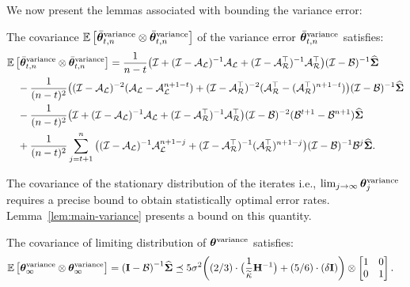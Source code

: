 We now present the lemmas associated with bounding the variance error:
\begin{lemma}\label{lem:average-covar-var}
	The covariance $\E{\thetavb^{\textrm{variance}} \otimes \thetavb^{\text{variance}}}$ of the variance error $\thetavb^{\textrm{variance}}$ satisfies:
	\iffalse
	\begin{align*}
	\lim_{n \to \infty}\E{\thetavb^{\textrm{variance}} \otimes \thetavb^{\text{variance}}} = \frac{1}{n-t}\big(\eyeT + (\eyeT-\AL)^{-1}\AL + (\eyeT-\AR\T)^{-1}\AR\T\big)(\eyeT-\BT)^{-1}\Sigh.
	\end{align*}
	\fi{\small
	\begin{align*}
	&\E{\thetavb^{\textrm{variance}} \otimes \thetavb^{\text{variance}}} = \frac{1}{n-t}\big(\eyeT + (\eyeT-\AL)^{-1}\AL + (\eyeT-\AR\T)^{-1}\AR\T\big)(\eyeT-\BT)^{-1}\Sigh	\nonumber\\
	&\quad -\frac{1}{(n-t)^2}\big((\eyeT-\AL)^{-2}(\AL-\AL^{n+1-t})+(\eyeT-\AR\T)^{-2}(\AR\T-(\AR\T)^{n+1-t})\big)(\eyeT-\BT)^{-1}\Sigh\nonumber\\
	&\quad -\frac{1}{(n-t)^2}\big(\eyeT + (\eyeT-\AL)^{-1}\AL + (\eyeT-\AR\T)^{-1}\AR\T\big)(\eyeT-\BT)^{-2}(\BT^{t+1}-\BT^{n+1})\Sigh\nonumber\\
	&\quad +\frac{1}{(n-t)^2}\sum_{j=t+1}^n\big((\eyeT-\AL)^{-1}\AL^{n+1-j}+(\eyeT-\AR\T)^{-1}(\AR\T)^{n+1-j}\big)(\eyeT-\BT)^{-1}\BT^j\Sigh.
	\end{align*}}
\end{lemma}
The covariance of the stationary distribution of the iterates i.e., $\lim_{j\to\infty}\thetav_j^{\textrm{variance}}$ requires a precise bound to obtain statistically optimal error rates. Lemma~\ref{lem:main-variance} presents a bound on this quantity. 
\begin{lemma}\label{lem:main-variance}
The covariance of limiting distribution of $\thetav^{\textrm{variance}}$ satisfies:
	\begin{align*}	\E{\thetav_{\infty}^{\textrm{variance}}\otimes\thetav_{\infty}^{\textrm{variance}}}=\inv{\left(\Id - \B\right)} \Sighat &\preceq 5\sigma^2\bigg((2/3)\cdot \big(\frac{1}{\cnS}\Hinv\big)+ (5/6) \cdot(\delta\eye)\bigg)\otimes\begin{bmatrix} 1 & 0 \\ 0 & 1\end{bmatrix}.
	\end{align*}%
\end{lemma}
